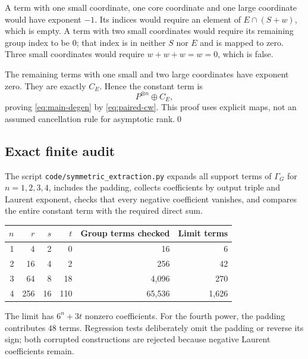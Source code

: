\documentclass[11pt]{article}
\theoremstyle{definition}\newtheorem{definition}[theorem]{Definition}
\begin{document}
A term with one small coordinate, one core coordinate and one large coordinate would have exponent $-1$. Its indices would require an element of $E\cap(S+w)$, which is empty. A term with two small coordinates would require its remaining group index to be $0$; that index is in neither $S$ nor $E$ and is mapped to zero. Three small coordinates would require $w+w+w=w=0$, which is false.

The remaining terms with one small and two large coordinates have exponent zero. They are exactly $C_E$. Hence the constant term is
\[
P^{\otimes n}\oplus C_E,
\]
proving \eqref{eq:main-degen} by \eqref{eq:paired-cw}. This proof uses explicit maps, not an assumed cancellation rule for asymptotic rank.\qed

\subsection{Exact finite audit}
The script \texttt{code/symmetric\_extraction.py} expands all support terms of $\Gamma_G$ for $n=1,2,3,4$, includes the padding, collects coefficients by output triple and Laurent exponent, checks that every negative coefficient vanishes, and compares the entire constant term with the required direct sum.

\begin{center}
\begin{tabular}{rrrrrr}
\toprule
$n$&$r$&$s$&$t$&Group terms checked&Limit terms\\\midrule
1&4&2&0&16&6\\
2&16&4&2&256&42\\
3&64&8&18&4,096&270\\
4&256&16&110&65,536&1,626\\\bottomrule
\end{tabular}
\end{center}
The limit has $6^n+3t$ nonzero coefficients. For the fourth power, the padding contributes $48$ terms. Regression tests deliberately omit the padding or reverse its sign; both corrupted constructions are rejected because negative Laurent coefficients remain.
\end{document}
